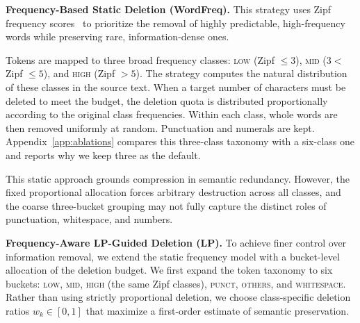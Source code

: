 \documentclass[11pt]{article}
\begin{document}
\textbf{Frequency-Based Static Deletion (WordFreq).}
\label{sec:wordfreq}
This strategy uses Zipf frequency scores~\citep{speer2022wordfreq} to prioritize the removal of highly predictable, high-frequency words while preserving rare, information-dense ones.

Tokens are mapped to three broad frequency classes: \textsc{low} (Zipf $\le 3$), \textsc{mid} ($3 <$ Zipf $\le 5$), and \textsc{high} (Zipf $> 5$). The strategy computes the natural distribution of these classes in the source text. When a target number of characters must be deleted to meet the budget, the deletion quota is distributed proportionally according to the original class frequencies. Within each class, whole words are then removed uniformly at random. Punctuation and numerals are kept.
Appendix~\ref{app:ablations} compares this three-class taxonomy with a six-class one and reports why we keep three as the default. 

This static approach grounds compression in semantic redundancy. However, the fixed proportional allocation forces arbitrary destruction across all classes, and the coarse three-bucket grouping may not fully capture the distinct roles of punctuation, whitespace, and numbers.

\textbf{Frequency-Aware LP-Guided Deletion (LP).}
\label{sec:optimize}
To achieve finer control over information removal, we extend the static frequency model with a bucket-level allocation of the deletion budget. We first expand the token taxonomy to six buckets: \textsc{low}, \textsc{mid}, \textsc{high} (the same Zipf classes), \textsc{punct}, \textsc{others}, and \textsc{whitespace}. Rather than using strictly proportional deletion, we choose class-specific deletion ratios $w_k \in [0,1]$ that maximize a first-order estimate of semantic preservation.
\end{document}
